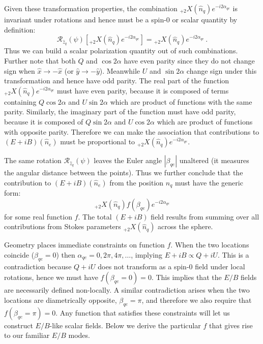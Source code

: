 \documentclass[a4paper,11pt]{article}
\newcommand{\beq}{\begin{equation}}
\newcommand{\eeq}{\end{equation}}
\begin{document}
Given these transformation properties, the combination ${}_{+2}X(\hat{n}_q)e^{-i2\alpha_{qe}}$ is invariant under rotations and hence must be a spin-0 or scalar quantity by definition:
\beq
\mathcal{R}_{\hat{z}_q}(\psi)[{}_{+2}X(\hat{n}_q)e^{-i2\alpha_{qe}}] = {}_{+2}X(\hat{n}_q) e^{-i2\alpha_{qe}} \,. \label{eq:invariant}
\eeq
Thus we can build a scalar polarization quantity out of such combinations.
Further note that both $Q$ and $\cos2 \alpha$ have even parity since they do not change sign when $\hat{x} \rightarrow -\hat{x}$ (or $\hat{y} \rightarrow -\hat{y}$).  Meanwhile $U$ and $\sin 2 \alpha$ change sign under this transformation and hence have odd parity. The real part of the function  ${}_{+2}X(\hat{n}_q)e^{-i2\alpha_{qe}}$ must have even parity, because it is composed of terms containing $Q\cos{2\alpha}$ and  $U\sin{2 \alpha}$ which are product of functions with the same parity. Similarly, the imaginary part of the function must have odd parity, because it is composed of $Q\sin{2 \alpha}$ and $U\cos{2\alpha}$ which are product of functions with opposite parity.  Therefore we can make the association that contributions to  $(E+iB)(\hat n_e)$ must be proportional to $ {}_{+2}X(\hat{n}_q) e^{-i2\alpha_{qe}}$.


The same rotation $\mathcal{R}_{\hat{z}_q}(\psi)$ leaves the Euler angle $|\beta_{qe}|$ unaltered (it measures the angular distance between the points).  Thus we further conclude that the contribution to $(E+iB)(\hat n_e)$ from the position $\hat{n}_q$ must have the generic form:
\beq
{}_{+2}X(\hat{n}_q) f(\beta_{qe})  e^{-i2\alpha_{qe}}
\eeq
for some real function $f$. The total $(E+iB)$ field results from summing over all  contributions  from Stokes parameters ${}_{+2}X(\hat{n}_q)$ across the sphere.

Geometry places immediate constraints on function $f$.  When the two locations coincide ($\beta_{qe}=0$) then  $\alpha_{qe}=0,2\pi,4\pi,\dots$, implying $E + iB \propto Q+iU$.  This is a contradiction because $Q+iU$ does not transform as a spin-0 field under local rotations, hence we must have $f(\beta_{qe} = 0 ) = 0$. This implies that the $E/B$ fields are necessarily defined non-locally.  A similar contradiction arises when the two locations are diametrically opposite, $\beta_{qe} = \pi$, and therefore we also require that $f(\beta_{qe} = \pi ) = 0$.  Any function that satisfies these constraints will let us construct $E/B$-like scalar fields.   Below we derive the particular $f$ that gives rise to our familiar $E/B$ modes.
\end{document}
